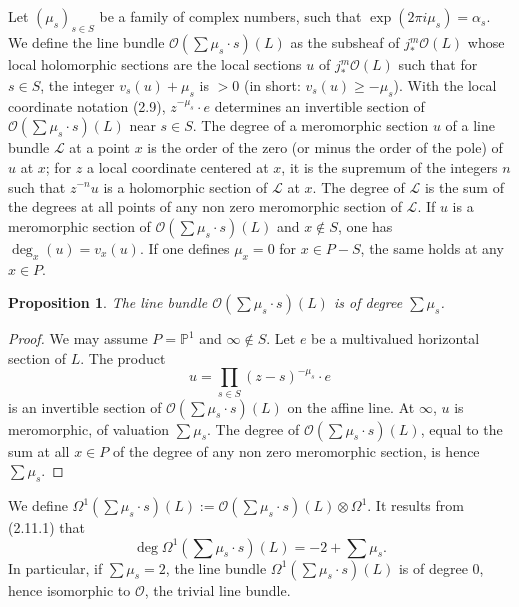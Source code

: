 \documentclass[12pt,a4paper]{article}
\theoremstyle{plain}
\newtheorem{proposition}[theorem]{Proposition}
\theoremstyle{definition}
\theoremstyle{remark}
\newcommand{\PP}{\mathbb{P}}
\numberwithin{equation}{section}
\providecommand{\PP}{\mathbb{P}}
\begin{document}
\subsection{}
Let $(\mu_s)_{s \in S}$ be a family of complex numbers, such that $\exp(2\pi i \mu_s) = \alpha_s$. We define the line bundle $\mathcal{O}(\sum \mu_s \cdot s)(L)$ as the subsheaf of $j_*^m \mathcal{O}(L)$ whose local holomorphic sections are the local sections $u$ of $j_*^m \mathcal{O}(L)$ such that for $s \in S$, the integer $v_s(u) + \mu_s$ is $> 0$ (in short: $v_s(u) \geq -\mu_s$). With the local coordinate notation (2.9), $z^{-\mu_s} \cdot e$ determines an invertible section of $\mathcal{O}(\sum \mu_s \cdot s)(L)$ near $s \in S$. The degree of a meromorphic section $u$ of a line bundle $\mathscr{L}$ at a point $x$ is the order of the zero (or minus the order of the pole) of $u$ at $x$; for $z$ a local coordinate centered at $x$, it is the supremum of the integers $n$ such that $z^{-n}u$ is a holomorphic section of $\mathscr{L}$ at $x$. The degree of $\mathscr{L}$ is the sum of the degrees at all points of any non zero meromorphic section of $\mathscr{L}$. If $u$ is a meromorphic section of $\mathcal{O}(\sum \mu_s \cdot s)(L)$ and $x \notin S$, one has $\deg_x(u) = v_x(u)$. If one defines $\mu_x = 0$ for $x \in P-S$, the same holds at any $x \in P$.

\begin{proposition}\label{prop:2.11.1}
The line bundle $\mathcal{O}(\sum \mu_s \cdot s)(L)$ is of degree $\sum \mu_s$.
\end{proposition}

\begin{proof}
We may assume $P = \PP^1$ and $\infty \notin S$. Let $e$ be a multivalued horizontal section of $L$. The product
\[
u = \prod_{s \in S} (z-s)^{-\mu_s} \cdot e
\]
is an invertible section of $\mathcal{O}(\sum \mu_s \cdot s)(L)$ on the affine line. At $\infty$, $u$ is meromorphic, of valuation $\sum \mu_s$. The degree of $\mathcal{O}(\sum \mu_s \cdot s)(L)$, equal to the sum at all $x \in P$ of the degree of any non zero meromorphic section, is hence $\sum \mu_s$.
\end{proof}

We define $\Omega^1(\sum \mu_s \cdot s)(L) := \mathcal{O}(\sum \mu_s \cdot s)(L) \otimes \Omega^1$. It results from (2.11.1) that
\begin{equation}\label{eq:2.11.2}
\deg \Omega^1(\sum \mu_s \cdot s)(L) = -2 + \sum \mu_s.
\end{equation}
In particular, if $\sum \mu_s = 2$, the line bundle $\Omega^1(\sum \mu_s \cdot s)(L)$ is of degree $0$, hence isomorphic to $\mathcal{O}$, the trivial line bundle.
\end{document}
